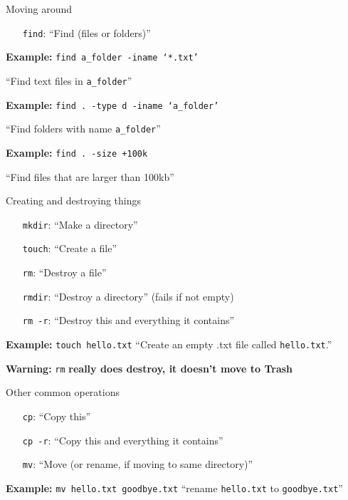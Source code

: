 \begin{frame}{Moving around}
    \begin{itemize}
        \item[\texttt{find}:] ``Find (files or folders)''
    \end{itemize}



    \textbf{Example:} \texttt{find a\_folder -iname `*.txt'}

    ``Find text files in \texttt{a\_folder}''

    \textbf{Example:} \texttt{find . -type d -iname `a\_folder'}

    ``Find folders with name \texttt{a\_folder}''

    \textbf{Example:} \texttt{find . -size +100k}

    ``Find files that are larger than 100kb''
\end{frame}

\begin{frame}{Creating and destroying things}
    \stretchon
    \begin{itemize}
        \item[\texttt{mkdir}:] ``Make a directory''
        \item[\texttt{touch}:] ``Create a file''
        \item[\texttt{rm}:] ``Destroy a file''
        \item[\texttt{rmdir}:] ``Destroy a directory'' (fails if not empty)
        \item[\texttt{rm -r}:] ``Destroy this and everything it contains''
    \end{itemize}

    \textbf{Example:} \texttt{touch hello.txt}
    ``Create an empty .txt file called \texttt{hello.txt}.''

    \large \textbf{Warning:} \texttt{rm} \textbf{really does destroy,
    it doesn't move to Trash}

\end{frame}

\begin{frame}{Other common operations}
    \stretchon
    \begin{itemize}
        \item[\texttt{cp}:] ``Copy this''
        \item[\texttt{cp -r}:] ``Copy this and everything it contains''
        \item[\texttt{mv}:] ``Move (or rename, if moving to same directory)''
    \end{itemize}
    \vspace{0.4cm}

    \textbf{Example:} \texttt{mv hello.txt goodbye.txt} ``rename \texttt{hello.txt} to \texttt{goodbye.txt}''
\end{frame}

